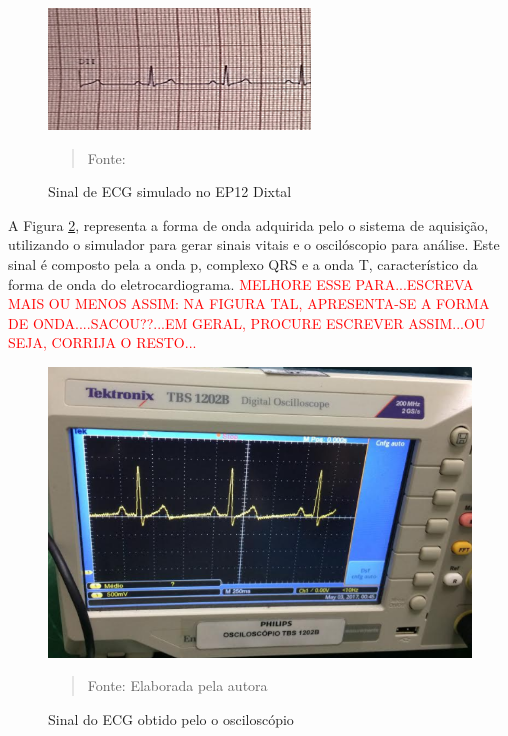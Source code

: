 \documentclass[12pt, a4paper]{article}
\begin{document}
\begin{figure}[H]
\begin{center}
			\caption{Sinal de ECG simulado no EP12 Dixtal}
			\includegraphics[width=.8\textwidth]{Figuras/exame.PNG}
              \vspace*{\fill} 
            \begin{quote} 
            \centering 
           Fonte: \cite{ronald}
            \end{quote}
            \vspace*{\fill}
			\label{fig:popi}
\end{center}
\end{figure}

A Figura \ref{fig:oscilo}, representa a forma de onda adquirida pelo o sistema de aquisição, utilizando o simulador para gerar sinais vitais e o oscilóscopio para análise. Este sinal é composto pela a onda p, complexo QRS e a onda T, característico da forma de onda do eletrocardiograma. \textcolor{red}{MELHORE ESSE PARA...ESCREVA MAIS OU MENOS ASSIM: NA FIGURA TAL, APRESENTA-SE A FORMA DE ONDA....SACOU??...EM GERAL, PROCURE ESCREVER ASSIM...OU SEJA, CORRIJA O RESTO...}

\begin{figure}[H]
\begin{center}
			\caption{Sinal do ECG obtido pelo o osciloscópio}
			\includegraphics[width=.9\textwidth]{Figuras/oscil.PNG}
             \vspace*{\fill} 
            \begin{quote} 
            \centering 
           Fonte: Elaborada pela autora
            \end{quote}
            \vspace*{\fill}
			\label{fig:oscilo}
\end{center}
\end{figure}
\end{document}
